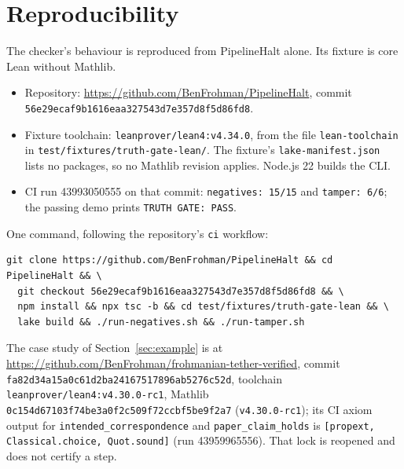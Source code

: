 \documentclass[11pt,a4paper]{article}
\newcommand{\code}[1]{\texttt{#1}}
\begin{document}
\section{Reproducibility}
The checker's behaviour is reproduced from PipelineHalt alone. Its fixture is core Lean without
Mathlib.
\begin{itemize}
\item Repository: \url{https://github.com/BenFrohman/PipelineHalt}, commit
  \code{56e29ecaf9b1616eaa327543d7e357d8f5d86fd8}.
\item Fixture toolchain: \code{leanprover/lean4:v4.34.0}, from the file
  \code{lean-toolchain} in \code{test/fixtures/truth-gate-lean/}. The fixture's
  \code{lake-manifest.json} lists no packages, so no Mathlib revision applies. Node.js 22 builds the CLI.
\item CI run 43993050555 on that commit: \code{negatives: 15/15} and \code{tamper: 6/6}; the
  passing demo prints \code{TRUTH GATE: PASS}.
\end{itemize}
One command, following the repository's \code{ci} workflow:
\begin{Verbatim}
git clone https://github.com/BenFrohman/PipelineHalt && cd PipelineHalt && \
  git checkout 56e29ecaf9b1616eaa327543d7e357d8f5d86fd8 && \
  npm install && npx tsc -b && cd test/fixtures/truth-gate-lean && \
  lake build && ./run-negatives.sh && ./run-tamper.sh
\end{Verbatim}
The case study of Section~\ref{sec:example} is at
\url{https://github.com/BenFrohman/frohmanian-tether-verified}, commit
\code{fa82d34a15a0c61d2ba24167517896ab5276c52d}, toolchain \code{leanprover/lean4:v4.30.0-rc1},
Mathlib \code{0c154d67103f74be3a0f2c509f72ccbf5be9f2a7} (\code{v4.30.0-rc1}); its CI axiom output
for \code{intended\_correspondence} and \code{paper\_claim\_holds} is
\code{[propext, Classical.choice, Quot.sound]} (run 43959965556). That lock is reopened and does
not certify a step.
\end{document}
